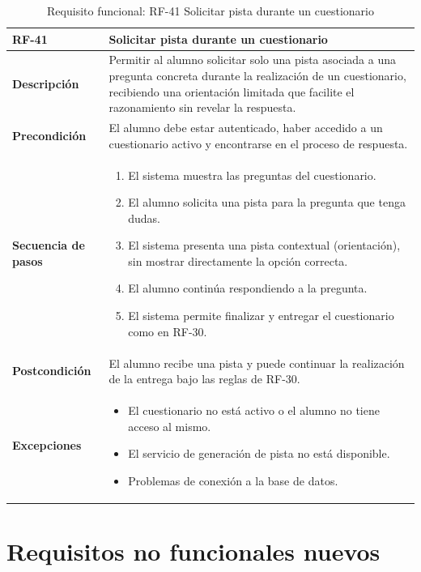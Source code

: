 \begin{table}[H]
\centering
\begin{tabularx}{\textwidth}{
  |>{\centering\arraybackslash}l
  |>{\centering\arraybackslash}X|}
\hline
\textbf{RF-41} & \textbf{Solicitar pista durante un cuestionario} \\ \hline
\textbf{Descripción} & Permitir al alumno solicitar solo una pista asociada a una pregunta concreta durante la realización de un cuestionario, recibiendo una orientación limitada que facilite el razonamiento sin revelar la respuesta. \\ \hline
\textbf{Precondición} & El alumno debe estar autenticado, haber accedido a un cuestionario activo y encontrarse en el proceso de respuesta. \\ \hline
\textbf{Secuencia de pasos} &
\begin{enumerate}
  \item El sistema muestra las preguntas del cuestionario.
  \item El alumno solicita una pista para la pregunta que tenga dudas.
  \item El sistema presenta una pista contextual (orientación), sin mostrar directamente la opción correcta.
  \item El alumno continúa respondiendo a la pregunta.
  \item El sistema permite finalizar y entregar el cuestionario como en RF-30.
\end{enumerate} \\ \hline
\textbf{Postcondición} & El alumno recibe una pista y puede continuar la realización de la entrega bajo las reglas de RF-30. \\ \hline
\textbf{Excepciones} &
\begin{itemize}
  \item El cuestionario no está activo o el alumno no tiene acceso al mismo.
  \item El servicio de generación de pista no está disponible.
  \item Problemas de conexión a la base de datos.
\end{itemize} \\ \hline
\end{tabularx}
\caption{Requisito funcional: RF-41 Solicitar pista durante un cuestionario}
\end{table}

\section{Requisitos no funcionales nuevos}
\label{sec:rnf_ext}

